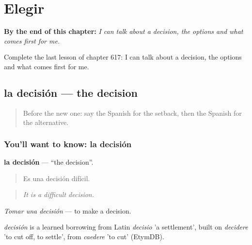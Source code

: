 
\chapter{Elegir}
\label{ch:es-elegir}

\begin{chapteropening}
\textbf{By the end of this chapter:} \emph{I can talk about a decision, the options and what comes first for me.}

Complete the last lesson of chapter 617: I can talk about a decision, the options and what comes first for me.
\end{chapteropening}

\section[la decisión]{la decisión — the decision}

\label{lesson:ES-C617-decision}



\begin{quote}
Before the new one: say the Spanish for the setback, then the Spanish for the alternative.
\end{quote}

\subsection*{You'll want to know: la decisión}
\textbf{la decisión} — \textquotedblleft{}the decision\textquotedblright{}.

\begin{quote}
Es una decisión difícil.
\end{quote}

\begin{quote}
\emph{It is a difficult decision.}
\end{quote}

\emph{Tomar una decisión} — to make a decision.

\begin{cousinweb}
\emph{decisión} is a learned borrowing from Latin \emph{decisio} 'a settlement', built on \emph{decidere} 'to cut off, to settle', from \emph{caedere} 'to cut' (EtymDB).
\end{cousinweb}

